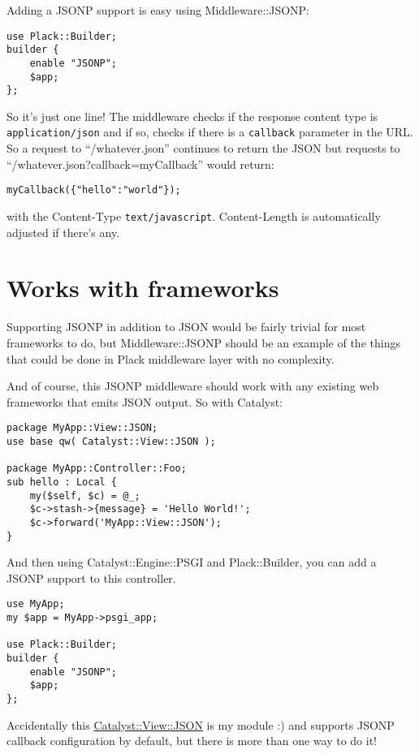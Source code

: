 Adding a JSONP support is easy using Middleware::JSONP:

\begin{lstlisting}
use Plack::Builder;
builder {
    enable "JSONP";
    $app;
};
\end{lstlisting}

So it's just one line! The middleware checks if the response content
type is \lstinline!application/json! and if so, checks if there is a
\lstinline!callback! parameter in the URL. So a request to
``/whatever.json'' continues to return the JSON but requests to
``/whatever.json?callback=myCallback'' would return:

\begin{lstlisting}
myCallback({"hello":"world"});
\end{lstlisting}

with the Content-Type \lstinline!text/javascript!. Content-Length is
automatically adjusted if there's any.

\section{Works with frameworks}\label{works-with-frameworks}

Supporting JSONP in addition to JSON would be fairly trivial for most
frameworks to do, but Middleware::JSONP should be an example of the
things that could be done in Plack middleware layer with no complexity.

And of course, this JSONP middleware should work with any existing web
frameworks that emits JSON output. So with Catalyst:

\begin{lstlisting}
package MyApp::View::JSON;
use base qw( Catalyst::View::JSON );

package MyApp::Controller::Foo;
sub hello : Local {
    my($self, $c) = @_;
    $c->stash->{message} = 'Hello World!';
    $c->forward('MyApp::View::JSON');
}
\end{lstlisting}

And then using Catalyst::Engine::PSGI and Plack::Builder, you can add a
JSONP support to this controller.

\begin{lstlisting}
use MyApp;
my $app = MyApp->psgi_app;

use Plack::Builder;
builder {
    enable "JSONP";
    $app;
};
\end{lstlisting}

Accidentally this
\href{http://search.cpan.org/perldoc?Catalyst::View::JSON}{Catalyst::View::JSON}
is my module :) and supports JSONP callback configuration by default,
but there is more than one way to do it!

